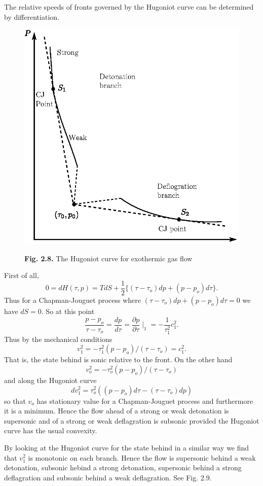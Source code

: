 The relative speeds of fronts governed by the Hugoniot curve can be determined by differentiation.
\begin{figure}[H]
\centering
\includegraphics{figures/fig2.8.eps}
\centerline{{\bf Fig. 2.8.} The Hugoniot curve for exothermic gas flow}
\end{figure}\pageoriginale

First of all,
$$
0 = dH (\tau, p) = TdS + \frac{1}{2} \{ (\tau - \tau_o)d p+ (p-p_o) d\tau\}.
$$
Thus for a Chapman-Jouguet process where $(\tau-\tau_o) dp+ (p-p_o) d\tau = 0$ we have $dS =0$. So at this point
$$
\frac{p-p_o}{\tau-\tau_o} = \frac{dp}{d\tau} = \frac{\partial p}{\partial \tau} \mid_1 = -\frac{1}{\tau^2_1} c^2_1. 
$$
Thus by the mechanical conditions
$$
v^2_1 = -\tau^2 _1 (p-p_o) / (\tau - \tau_o) = c^2 _1.
$$
That is, the state behind is sonic relative to the front. On the other hand
$$
v^2_o =- \tau^2_o (p-p_o) / (\tau - \tau_o)
$$ 
and along the Hugoniot curve
$$
dv^2_1 = \tau^2_o ((p-p_o) d\tau - (\tau-\tau_o)dp)
$$\pageoriginale
so that $v_o$ has stationary value for a Chapman-Jouguet process and furthermore it is a minimum. Hence the flow ahead of a strong or weak detonation is supersonic and of a strong or weak deflagration is subsonic provided the Hugoniot curve has the usual convexity.

By looking at the Hugoniot curve for the state behind in a similar way
we find that $v^2_1$ is monotonic on each branch. Hence the flow is
supersonic behind a weak detonation, subsonic hebind a strong
detonation, supersonic behind a strong deflagration and subsonic
behind a weak deflagration. See Fig. 2.9.

